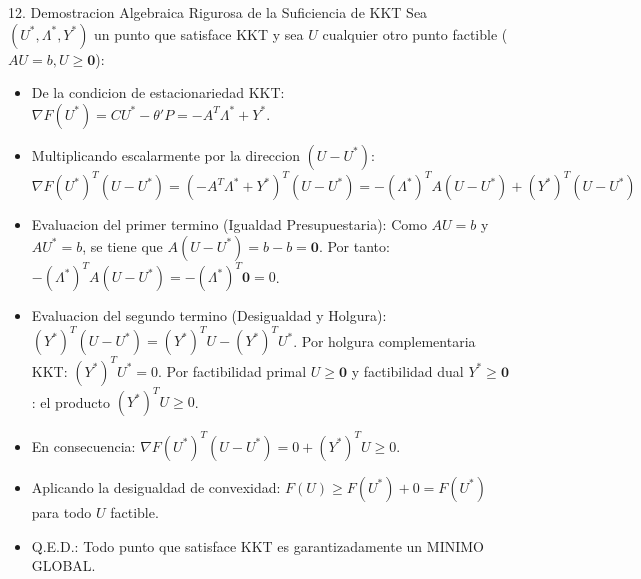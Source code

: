 \documentclass[aspectratio=169,10pt]{beamer}
\begin{document}
\begin{frame}{12. Demostracion Algebraica Rigurosa de la Suficiencia de KKT}
  Sea $(U^*, \Lambda^*, Y^*)$ un punto que satisface KKT y sea $U$ cualquier otro punto factible ($AU = b, U \ge \mathbf{0}$):
  \vspace{0.15cm}
  \begin{itemize}
    \item De la condicion de estacionariedad KKT: $\nabla F(U^*) = CU^* - \theta' P = -A^T \Lambda^* + Y^*$.
    \vspace{0.1cm}
    \item Multiplicando escalarmente por la direccion $(U - U^*)$:
    \begin{equation*}
      \nabla F(U^*)^T (U - U^*) = \left( -A^T \Lambda^* + Y^* \right)^T (U - U^*) = -(\Lambda^*)^T A (U - U^*) + (Y^*)^T (U - U^*)
    \end{equation*}
    \item Evaluacion del primer termino (Igualdad Presupuestaria):
    Como $AU = b$ y $AU^* = b$, se tiene que $A(U - U^*) = b - b = \mathbf{0}$.
    Por tanto: $-(\Lambda^*)^T A(U - U^*) = -(\Lambda^*)^T \mathbf{0} = 0$.
    \vspace{0.1cm}
    \item Evaluacion del segundo termino (Desigualdad y Holgura):
    $(Y^*)^T (U - U^*) = (Y^*)^T U - (Y^*)^T U^*$.
    Por holgura complementaria KKT: $(Y^*)^T U^* = 0$.
    Por factibilidad primal $U \ge \mathbf{0}$ y factibilidad dual $Y^* \ge \mathbf{0}$: el producto $(Y^*)^T U \ge 0$.
    \vspace{0.1cm}
    \item En consecuencia: $\nabla F(U^*)^T (U - U^*) = 0 + (Y^*)^T U \ge 0$.
    \vspace{0.1cm}
    \item Aplicando la desigualdad de convexidad: $F(U) \ge F(U^*) + 0 = F(U^*)$ para todo $U$ factible.
    \item Q.E.D.: Todo punto que satisface KKT es garantizadamente un MINIMO GLOBAL.
  \end{itemize}
\end{frame}
\end{document}
